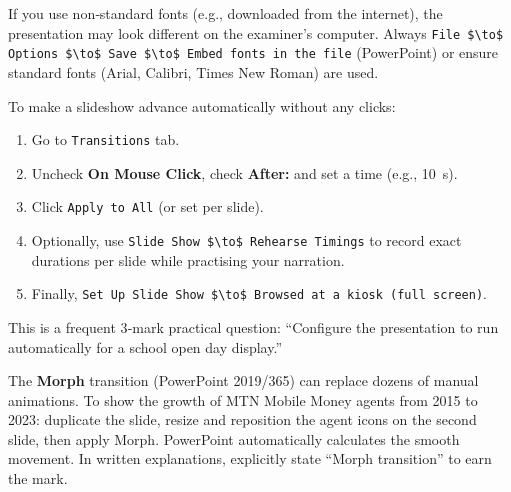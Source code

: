 \documentclass[11pt]{article}
\begin{document}
\begin{attention}
If you use non‑standard fonts (e.g., downloaded from the internet), the presentation may look different on the examiner’s computer. Always \texttt{File \$\textbackslash{}to\$ Options \$\textbackslash{}to\$ Save \$\textbackslash{}to\$ Embed fonts in the file} (PowerPoint) or ensure standard fonts (Arial, Calibri, Times New Roman) are used.
\end{attention}

\begin{propriete}
To make a slideshow advance automatically without any clicks:
\begin{enumerate}
\item Go to \texttt{Transitions} tab.
\item Uncheck \textbf{On Mouse Click}, check \textbf{After:} and set a time (e.g., \SI{10}{s}).
\item Click \texttt{Apply to All} (or set per slide).
\item Optionally, use \texttt{Slide Show \$\textbackslash{}to\$ Rehearse Timings} to record exact durations per slide while practising your narration.
\item Finally, \texttt{Set Up Slide Show \$\textbackslash{}to\$ Browsed at a kiosk (full screen)}.
\end{enumerate}
This is a frequent 3‑mark practical question: “Configure the presentation to run automatically for a school open day display.”
\end{propriete}

\begin{propriete}
The \textbf{Morph} transition (PowerPoint 2019/365) can replace dozens of manual animations. To show the growth of MTN Mobile Money agents from 2015 to 2023: duplicate the slide, resize and reposition the agent icons on the second slide, then apply Morph. PowerPoint automatically calculates the smooth movement. In written explanations, explicitly state “Morph transition” to earn the mark.
\end{propriete}
\end{document}
